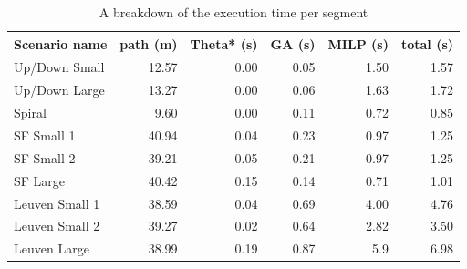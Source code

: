 \begin{table}[]
\centering
\begin{tabular}{ l | r | r | r | r | r}
Scenario name & path (m) & Theta* (s) & GA (s) & MILP (s)  & total (s) \\
\hline
Up/Down Small 	& 12.57	& 0.00 	& 0.05 	& 1.50 	& 1.57 	\\ 
Up/Down Large 	& 13.27	& 0.00 	& 0.06 	& 1.63 	& 1.72 	\\
Spiral		 	& 9.60	& 0.00 	& 0.11	& 0.72	& 0.85	\\
SF Small 1		& 40.94 & 0.04 	& 0.23 	& 0.97 	& 1.25 	\\
SF Small 2		& 39.21	& 0.05 	& 0.21	& 0.97 	& 1.25 	\\
SF Large	 	& 40.42	& 0.15	& 0.14	& 0.71 	& 1.01 	\\
Leuven Small 1 	& 38.59	& 0.04 	& 0.69	& 4.00	& 4.76	\\
Leuven Small 2	& 39.27	& 0.02 	& 0.64	& 2.82 	& 3.50	\\
Leuven Large 	& 38.99	& 0.19	& 0.87	& 5.9 	& 6.98 	\\
\end{tabular}
\caption{A breakdown of the execution time per segment}
\label{table:gen-results-rel}
\end{table}

\newpage
